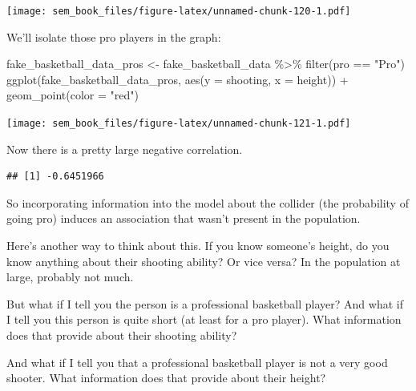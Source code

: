 \documentclass[
]{book}
\newenvironment{Shaded}{\begin{snugshade}}{\end{snugshade}}
\newcommand{\AttributeTok}[1]{\textcolor[rgb]{0.77,0.63,0.00}{#1}}
\newcommand{\FunctionTok}[1]{\textcolor[rgb]{0.00,0.00,0.00}{#1}}
\newcommand{\NormalTok}[1]{#1}
\newcommand{\OtherTok}[1]{\textcolor[rgb]{0.56,0.35,0.01}{#1}}
\newcommand{\SpecialCharTok}[1]{\textcolor[rgb]{0.00,0.00,0.00}{#1}}
\newcommand{\StringTok}[1]{\textcolor[rgb]{0.31,0.60,0.02}{#1}}
\begin{document}
\texttt{[image: sem\_book\_files/figure-latex/unnamed-chunk-120-1.pdf]}

We'll isolate those pro players in the graph:

\begin{Shaded}
\begin{Highlighting}[]
\NormalTok{fake\_basketball\_data\_pros }\OtherTok{\textless{}{-}}\NormalTok{ fake\_basketball\_data }\SpecialCharTok{\%\textgreater{}\%}
    \FunctionTok{filter}\NormalTok{(pro }\SpecialCharTok{==} \StringTok{"Pro"}\NormalTok{)}
\FunctionTok{ggplot}\NormalTok{(fake\_basketball\_data\_pros,}
       \FunctionTok{aes}\NormalTok{(}\AttributeTok{y =}\NormalTok{ shooting, }\AttributeTok{x =}\NormalTok{ height)) }\SpecialCharTok{+}
    \FunctionTok{geom\_point}\NormalTok{(}\AttributeTok{color =} \StringTok{"red"}\NormalTok{)}
\end{Highlighting}
\end{Shaded}

\texttt{[image: sem\_book\_files/figure-latex/unnamed-chunk-121-1.pdf]}

Now there is a pretty large negative correlation.

\begin{Shaded}
\end{Shaded}

\begin{verbatim}
## [1] -0.6451966
\end{verbatim}

So incorporating information into the model about the collider (the probability of going pro) induces an association that wasn't present in the population.

Here's another way to think about this. If you know someone's height, do you know anything about their shooting ability? Or vice versa? In the population at large, probably not much.

But what if I tell you the person is a professional basketball player? And what if I tell you this person is quite short (at least for a pro player). What information does that provide about their shooting ability?

And what if I tell you that a professional basketball player is not a very good shooter. What information does that provide about their height?
\end{document}
